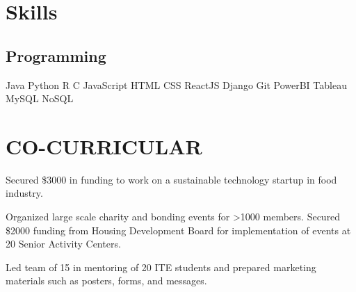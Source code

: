 \documentclass[]{deedy-resume}
\begin{document}
\begin{minipage}[t]{0.33\textwidth}

\section{Skills}
\subsection{Programming}
\textbullet{}Java 
\textbullet{}Python 
\textbullet{}R
\textbullet{}C
\textbullet{}JavaScript
\textbullet{}HTML
\textbullet{}CSS
\textbullet{}ReactJS
\textbullet{}Django
\textbullet{}Git
\textbullet{}PowerBI
\textbullet{}Tableau
\textbullet{}MySQL
\textbullet{}NoSQL
\sectionsep


\section{CO-CURRICULAR}

Secured \$3000 in funding to work on a sustainable technology startup in food industry.

\sectionsep
{}
Organized large scale charity and bonding events for >1000 members. Secured \$2000 funding from Housing Development Board for implementation of events at 20 Senior Activity Centers.
\sectionsep

\sectionsep
{}
\descript{|  }
Led team of 15 in mentoring of 20 ITE students and prepared marketing materials such as posters, forms, and messages.
\sectionsep

%
%

\end{minipage} 
\hfill
\end{document}
